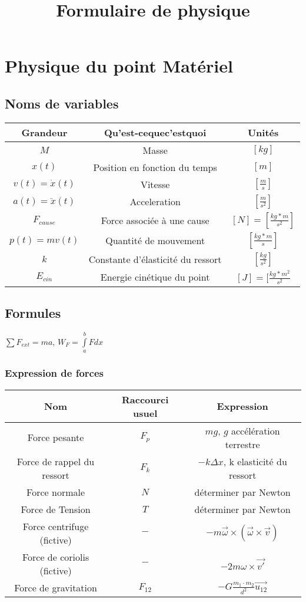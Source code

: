 \documentclass[10pt,a4paper]{article}
\title{Formulaire de physique}
\begin{document}
\section{Physique du point Matériel}

\subsection{Noms de variables}

\begin{tabular}{|c|c|c|}
\hline 
Grandeur & Qu'est-cequec'estquoi & Unités \\ 
\hline 
$M$ & Masse & $[kg]$ \\
\hline
$x(t)$ & Position en fonction du temps & $[m]$ \\ 
\hline
$v(t) = \dot{x}(t)$ & Vitesse & $[\frac{m}{s}]$ \\
\hline

$a(t) = \ddot{x}(t)$ & Acceleration & $[\frac{m}{s^2}]$ \\

\hline
$F_{cause}$ & Force associée à une cause & $[N] = [\frac{kg*m}{s^2}]$ \\
\hline
$p(t) = mv(t)$ & Quantité de mouvement & $[\frac{kg*m}{s}]$ \\
\hline
$k$ & Constante d'élasticité du ressort & $[\frac{kg}{s^2}]$\\
\hline
$E_{cin}$ & Energie cinétique du point & $[J] = [\frac{kg*m^2}{s^2}$ \\
\hline
\end{tabular}

\subsection{Formules}


$\sum F_{ext} = ma$, $W_F = \int\limits_a^b F dx$

\subsubsection{Expression de forces}

\begin{tabular}{c|c|c}
Nom & Raccourci usuel & Expression \\
\hline
Force pesante & $F_p$ & $mg$, $g$ accélération terrestre \\
Force de rappel du ressort & $F_k$ & $-k\Delta x$, k elasticité du ressort\\
Force normale & $N$ & déterminer par Newton \\
Force de Tension & $T$ & déterminer par Newton \\
Force centrifuge (fictive) & $-$ & $-m\vec\omega \times (\vec\omega \times \vec v)$ \\
Force de coriolis (fictive) & $-$ & $-2m\omega \times \vec{v'}$ \\
Force de gravitation & $F_{12}$ & $-G\frac{m_1 \cdot m_2}{d^2}\vec{u_{12}}$ \\
\end{tabular}
\end{document}
